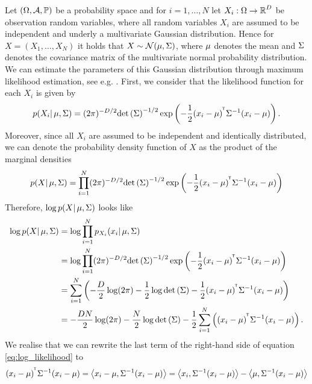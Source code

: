\begin{example}\label{ex:mle_gaussian}
Let $(\O, \A, \prob)$ be a probability space and for $i=1,\ldots, N$ let $X_i:\O\to\R^{D}$ be observation random variables, where all random variables $X_i$ are assumed to be independent and underly a multivariate Gaussian distribution. Hence for $X = (X_1, \ldots, X_N)$ it holds that $X\sim \mathcal{N}(\m, \S)$, where $\m$ denotes the mean and $\S$ denotes the covariance matrix of the multivariate normal probability distribution. We can estimate the parameters of this Gaussian distribution through maximum likelihood estimation, see e.g. \cite[Section~2.3.4]{bishop2006pattern}. First, we consider that the likelihood function for each $X_i$ is given by
\begin{align*}
p(X_i| \m, \S) = (2\pi)^{-D/2} \det \left( \S \right)^{-1/2} \exp \left( -\frac{1}{2} (x_i - \m)^{\tran}\S^{-1} (x_i - \m) \right).
\end{align*}
Moreover, since all $X_i$ are assumed to be independent and identically distributed, we can denote the probability density function of $X$ as the product of the marginal densities
\begin{align*}
p(X| \m, \S) = \prod_{i=1}^N (2\pi)^{-D/2} \det \left( \S \right)^{-1/2} \exp \left( -\frac{1}{2} (x_i - \m)^{\tran}\S^{-1} (x_i - \m) \right)
\end{align*}
Therefore, $\log p(X| \m, \S)$ looks like
\begin{align}\label{eq:log_likelihood}
\log p(X| \m, \S) &= \log \prod_{i=1}^N p_{X_i} (x_i|\m, \S)\nonumber\\
&= \log \prod_{i=1}^N (2\pi)^{-D/2} \det \left( \S \right)^{-1/2} \exp \left( -\frac{1}{2} (x_i - \m)^{\tran}\S^{-1} (x_i - \m) \right)\nonumber\\
&= \sum_{i=1}^N \left(-\frac{D}{2} \log(2\pi) - \frac{1}{2}\log \det\left(\S\right) - \frac{1}{2} (x_i - \m)^{\tran}\S^{-1} (x_i - \m) \right)\nonumber\\
&= -\frac{DN}{2}\log(2\pi) - \frac{N}{2} \log \det\left(\S\right) - \frac{1}{2} \sum_{i=1}^N \left( (x_i - \m)^{\tran}\S^{-1} (x_i - \m) \right).
\end{align}
We realise that we can rewrite the last term of the right-hand side of equation \eqref{eq:log_likelihood} to
\begin{align*}
(x_i - \m)^{\tran}\S^{-1} (x_i - \m) &= \left\langle x_i - \m, \S^{-1}(x_i - \m) \right\rangle = \left\langle x_i, \S^{-1}(x_i - \m) \right\rangle - \left\langle \m, \S^{-1}(x_i - \m) \right\rangle\\

\end{align*}
\end{example}
